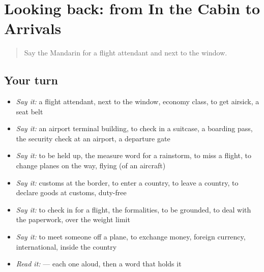 \section[(dialogue)]{Looking back: from In the Cabin to Arrivals}

\label{lesson:ZH-R419-review-414-419}



\begin{quote}
Say the Mandarin for a flight attendant and next to the window.
\end{quote}

\subsection*{Your turn}
\begin{itemize}
\raggedright
  \item \emph{Say it:} a flight attendant, next to the window, economy class, to get airsick, a seat belt
  \item \emph{Say it:} an airport terminal building, to check in a suitcase, a boarding pass, the security check at an airport, a departure gate
  \item \emph{Say it:} to be held up, the measure word for a rainstorm, to miss a flight, to change planes on the way, flying (of an aircraft)
  \item \emph{Say it:} customs at the border, to enter a country, to leave a country, to declare goods at customs, duty-free
  \item \emph{Say it:} to check in for a flight, the formalities, to be grounded, to deal with the paperwork, over the weight limit
  \item \emph{Say it:} to meet someone off a plane, to exchange money, foreign currency, international, inside the country
  \item \emph{Read it:}   — each one aloud, then a word that holds it
\end{itemize}


